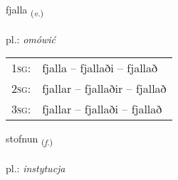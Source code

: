 \documentclass[frontgrid, backgrid]{flacards}\usepackage[]{graphicx}\usepackage[]{xcolor}
\begin{document}
\renewcommand{\blhead}{\vskip5pt {\small\bfseries\footnotesize Nafnorð | Verb }}
\renewcommand{\bcfoot}{\vskip5pt \hspace{2pt}{\small\bfseries\footnotesize 1K}}


{fjalla \small{\textsubscript{(\textit{v.})}} \\[1ex] %
\textphonetic{[fjatla]} \\
pl.: \emph{omówić} \\  [2ex]
\renewcommand*{\arraystretch}{0.8}
\begin{tabular}{p{1cm}l}
\textsc{1sg}: & fjalla -- fjallaði -- fjallað \\ 
\textsc{2sg}: & fjallar -- fjallaðir -- fjallað \\ 
\textsc{3sg}: & fjallar -- fjallaði -- fjallað \\ 
\end{tabular}
}

\renewcommand{\flhead}{\vskip5pt \fboxsep=0pt {\small\bfseries\footnotesize Nafnorð | Noun}}
\renewcommand{\fcfoot}{\vskip5pt \fboxsep=0pt \hspace{2pt}{\small\bfseries\footnotesize 1K}}

\renewcommand{\blhead}{\vskip5pt {\small\bfseries\footnotesize Nafnorð | Noun }}
\renewcommand{\bcfoot}{\vskip5pt \hspace{2pt}{\small\bfseries\footnotesize 1K}}


{stofnun \small{\textsubscript{(\textit{f.})}} \\[1ex] %
\textphonetic{[stɔpnʏn]} \\
pl.: \emph{instytucja} \\  [2ex]
\renewcommand*{\arraystretch}{0.8}
}
\end{document}
